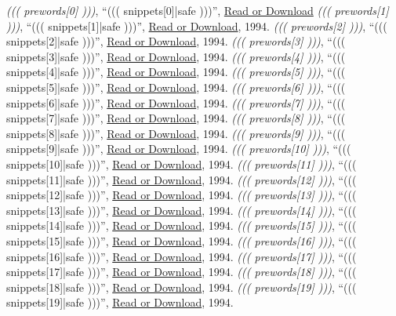 \documentclass{article}
\begin{document}
\begin{thebibliography}{99}

\emph{((( prewords[0] )))}, ``{((( snippets[0]|safe )))}'', \href{((( lander[0] ))) }{Read or Download}
\emph{((( prewords[1] )))}, ``{((( snippets[1]|safe )))}'', \href{((( lander[1] )))}{Read or Download}, 1994.
\emph{((( prewords[2] )))}, ``{((( snippets[2]|safe )))}'', \href{((( lander[2] )))}{Read or Download}, 1994.
\emph{((( prewords[3] )))}, ``{((( snippets[3]|safe )))}'', \href{((( lander[3] )))}{Read or Download}, 1994.
\emph{((( prewords[4] )))}, ``{((( snippets[4]|safe )))}'', \href{((( lander[4] )))}{Read or Download}, 1994.
\emph{((( prewords[5] )))}, ``{((( snippets[5]|safe )))}'', \href{((( lander[5] )))}{Read or Download}, 1994.
\emph{((( prewords[6] )))}, ``{((( snippets[6]|safe )))}'', \href{((( lander[6] )))}{Read or Download}, 1994.
\emph{((( prewords[7] )))}, ``{((( snippets[7]|safe )))}'', \href{((( lander[7] )))}{Read or Download}, 1994.
\emph{((( prewords[8] )))}, ``{((( snippets[8]|safe )))}'', \href{((( lander[8] )))}{Read or Download}, 1994.
\emph{((( prewords[9] )))}, ``{((( snippets[9]|safe )))}'', \href{((( lander[9] )))}{Read or Download}, 1994.
\emph{((( prewords[10] )))}, ``{((( snippets[10]|safe )))}'', \href{((( lander[10] )))}{Read or Download}, 1994.
\emph{((( prewords[11] )))}, ``{((( snippets[11]|safe )))}'', \href{((( lander[11] )))}{Read or Download}, 1994.
\emph{((( prewords[12] )))}, ``{((( snippets[12]|safe )))}'', \href{((( lander[12] )))}{Read or Download}, 1994.
\emph{((( prewords[13] )))}, ``{((( snippets[13]|safe )))}'', \href{((( lander[13] )))}{Read or Download}, 1994.
\emph{((( prewords[14] )))}, ``{((( snippets[14]|safe )))}'', \href{((( lander[14] )))}{Read or Download}, 1994.
\emph{((( prewords[15] )))}, ``{((( snippets[15]|safe )))}'', \href{((( lander[15] )))}{Read or Download}, 1994.
\emph{((( prewords[16] )))}, ``{((( snippets[16]|safe )))}'', \href{((( lander[16] )))}{Read or Download}, 1994.
\emph{((( prewords[17] )))}, ``{((( snippets[17]|safe )))}'', \href{((( lander[17] )))}{Read or Download}, 1994.
\emph{((( prewords[18] )))}, ``{((( snippets[18]|safe )))}'', \href{((( lander[18] )))}{Read or Download}, 1994.
\emph{((( prewords[19] )))}, ``{((( snippets[19]|safe )))}'', \href{((( lander[19] )))}{Read or Download}, 1994.

\end{thebibliography}
\end{document}
